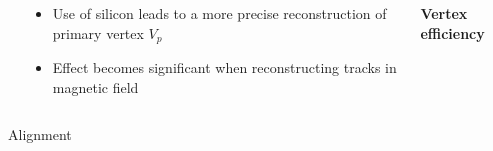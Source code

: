 \documentclass[dvipsnames, aspectratio=43] {beamer}
\begin{document}
\begin{frame}
\begin{columns}[t]
\begin{block}{}
    \end{block}
    \begin{block}{}
      \begin{itemize}
      \item {\footnotesize Use of silicon leads to a more precise reconstruction of primary vertex $V_{p}$}
      \item {\footnotesize Effect becomes significant when reconstructing tracks in magnetic field}
      \end{itemize}
    \end{block}
    \begin{block}{\bf \centering Vertex efficiency}
    \end{block}
  \end{columns}
\end{frame}

\begin{frame}
  \bf
  \begin{block}{}
    \begin{center}
      {\Huge Alignment}
    \end{center}
  \end{block}
\end{frame}
\end{document}
